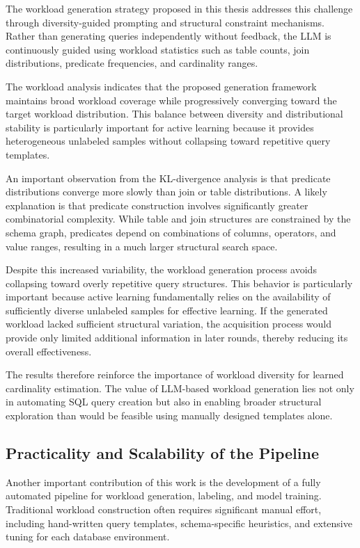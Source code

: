 The workload generation strategy proposed in this thesis addresses this challenge through diversity-guided prompting and structural constraint mechanisms. Rather than generating queries independently without feedback, the LLM is continuously guided using workload statistics such as table counts, join distributions, predicate frequencies, and cardinality ranges.

The workload analysis indicates that the proposed generation framework maintains broad workload coverage while progressively converging toward the target workload distribution. This balance between diversity and distributional stability is particularly important for active learning because it provides heterogeneous unlabeled samples without collapsing toward repetitive query templates.

An important observation from the KL-divergence analysis is that predicate distributions converge more slowly than join or table distributions. A likely explanation is that predicate construction involves significantly greater combinatorial complexity. While table and join structures are constrained by the schema graph, predicates depend on combinations of columns, operators, and value ranges, resulting in a much larger structural search space.

Despite this increased variability, the workload generation process avoids collapsing toward overly repetitive query structures. This behavior is particularly important because active learning fundamentally relies on the availability of sufficiently diverse unlabeled samples for effective learning. If the generated workload lacked sufficient structural variation, the acquisition process would provide only limited additional information in later rounds, thereby reducing its overall effectiveness.

The results therefore reinforce the importance of workload diversity for learned cardinality estimation. The value of LLM-based workload generation lies not only in automating SQL query creation but also in enabling broader structural exploration than would be feasible using manually designed templates alone.

\subsection{Practicality and Scalability of the Pipeline}

Another important contribution of this work is the development of a fully automated pipeline for workload generation, labeling, and model training. Traditional workload construction often requires significant manual effort, including hand-written query templates, schema-specific heuristics, and extensive tuning for each database environment.

